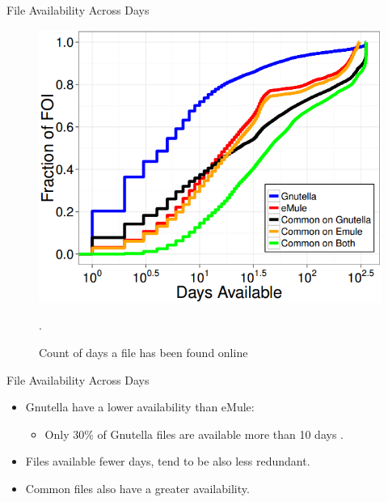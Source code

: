 \documentclass[notes]{beamer}
\begin{document}
\begin{frame}

\begin{block}{File Availability Across Days}

\begin{figure}[!htb]
\centering
\includegraphics[scale=0.5]{FOI_availability}
\caption{Count of days a file has been found online}.
\label{fig:FOI_availability}
\end{figure}

\end{block}

\end{frame}

\begin{frame}

\begin{block}{File Availability Across Days}

\begin{itemize}

\item[\checkmark]Gnutella have a lower availability than eMule:

	\begin{itemize}

	\item Only 30\% of Gnutella files are available more than 10 days	.
	
	\end{itemize}

\item[\checkmark]Files available fewer days, tend to be also less redundant.

\item[\checkmark]Common files also have a greater availability.

\end{itemize}

\end{block}

\end{frame}
\end{document}
